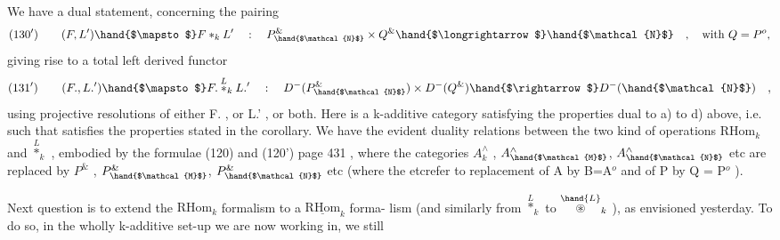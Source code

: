 We have a dual statement, concerning the pairing
\[ (130') \qquad (F,L') \hand{$\mapsto$} F \ast_k L' \quad : \quad P^{\&}_{\hand{$\mathcal{N}$}} \times Q^{\&} \hand{$\longrightarrow$} \hand{$\mathcal{N}$} \quad , \quad \text{with } Q = P^{o} , \]
giving rise to a total left derived functor
\[ (131') \qquad (F.,L.') \hand{$\mapsto$} F. \overset{L}{\ast}_k L.' \quad : \quad D^{-}(P^{\&}_{\hand{$\mathcal{N}$}}) \times D^{-}(Q^{\&}) \hand{$\rightarrow$} D^{-}(\hand{$\mathcal{N}$}) \quad , \]
using  projective resolutions of either F. , or L.' , or both.
Here  is a k-additive category satisfying the properties dual to
a) to d) above, i.e. such that  satisfies the properties stated
in the corollary. We have the evident duality relations between the
two kind of operations $\mathrm{RHom}_k$ and $\overset{L}{\ast}_k$ , embodied by the formulae
(120) and (120')  page 431 , where the categories $A^{\wedge}_k$ , $A^{\wedge}_{\hand{$\mathcal{M}$}}$, 
$A^{\wedge}_{\hand{$\mathcal{N}$}}$ etc are replaced by $P^{\&}$ , $P^{\&}_{\hand{$\mathcal{M}$}}$, $P^{\&}_{\hand{$\mathcal{N}$}}$ etc (where the etc\hand{/}refer to
replacement of A by B=A$^{o}$ and of P by Q = P$^{o}$ ).

Next question is to extend the $\mathrm{RHom}_k$ formalism to a $\underline{\mathrm{RHom}}_k$ forma-%
lism (and similarly from $\overset{L}{\ast}_k$ to $\overset{\hand{L}}{\circledast}_k$ ), as envisioned yesterday. To
do so, in the wholly k-additive set-up we are now working in, we still

